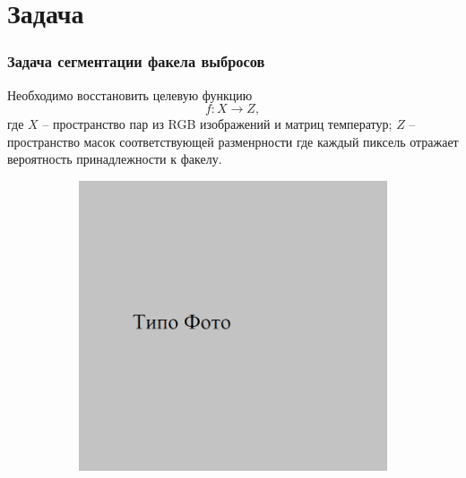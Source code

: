 \documentclass[t]{beamer}
\begin{document}
\section{Задача}

	\begin{frame}
		\frametitle{Задача сегментации факела выбросов} 
		\vspace*{-0.3cm}
		Необходимо восстановить целевую функцию
		\begin{equation}
			f: X \rightarrow Z,
			\label{eq:segment_func}
		\end{equation}
	где $X$ -- пространство пар из RGB изображений и матриц температур;
	$Z$ -- пространство масок соответствующей разменрности где каждый пиксель отражает вероятность принадлежности к факелу.
	\begin{figure}[ht!]
		\begin{subfigure}{.25\textwidth}
			\centering
			\includegraphics[width = \textwidth]{image/opt_examp}
			\caption{}
		\end{subfigure}
		\begin{subfigure}{.25\textwidth}
			\centering

\end{subfigure}
\end{figure}
\end{frame}
\end{document}
